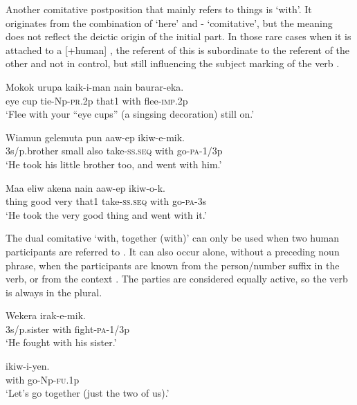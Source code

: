Another comitative postposition that mainly refers to things is  `with'. It originates from the combination of  `here' and - `comitative', but the meaning does not reflect the deictic origin of the initial part. In those rare cases when it is attached to a [+human] , the referent of this  is subordinate to the referent of the other  and not in control, but still influencing the subject marking of the verb . 

\ea%
\label{ex:3:x824}
\gll Mokok urupa kaik-i-man nain  baurar-eka. \\
eye cup tie-Np-\textsc{pr}.2p that1 with flee-\textsc{imp}.2p\\
\glt`Flee with your ``eye cups'' (a singsing decoration) still on.'
\z

\ea%
\label{ex:3:x825}
\gll Wiamun gelemuta pun aaw-ep  ikiw-e-mik. \\
3s/p.brother small also take-\textsc{ss}.\textsc{seq} with go-\textsc{pa}-1/3p\\
\glt`He took his little brother too, and went with him.'
\z

\ea%
\label{ex:3:x1818}
\gll Maa eliw akena nain aaw-ep  ikiw-o-k. \\
thing good very that1 take-\textsc{ss}.\textsc{seq} with go-\textsc{pa}-3s\\
\glt`He took the very good thing and went with it.'
\z

The dual comitative  `with, together (with)' can only be used when two human participants are referred to . It can also occur alone, without a preceding noun phrase, when the participants are known from the person/number suffix in the verb, or from the context . The parties are considered equally active, so the verb is always in the plural.

\ea%
\label{ex:3:x752}
\gll Wekera  irak-e-mik. \\
3s/p.sister with fight-\textsc{pa}-1/3p\\
\glt`He fought with his sister.'
\z

\ea%
\label{ex:3:x753}
\gll {} ikiw-i-yen. \\
with go-Np-\textsc{fu}.1p\\
\glt`Let's go together (just the two of us).'
\z

